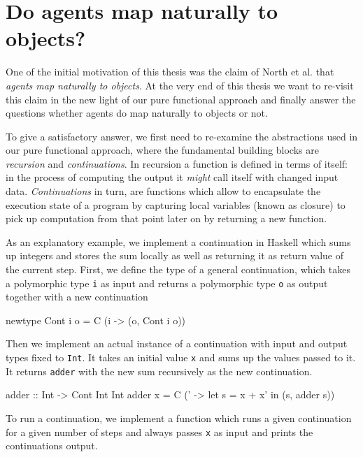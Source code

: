 \section{Do agents map naturally to objects?}
One of the initial motivation of this thesis was the claim of North et al. \cite{north_managing_2007} that \textit{agents map naturally to objects}. At the very end of this thesis we want to re-visit this claim in the new light of our pure functional approach and finally answer the questions whether agents do map naturally to objects or not.

\medskip

To give a satisfactory answer, we first need to re-examine the abstractions used in our pure functional approach, where the fundamental building blocks are \textit{recursion} and \textit{continuations}. In recursion a function is defined in terms of itself: in the process of computing the output it \textit{might} call itself with changed input data. \textit{Continuations} in turn, are functions which allow to encapsulate the execution state of a program by capturing local variables (known as closure) to pick up computation from that point later on by returning a new function.

As an explanatory example, we implement a continuation in Haskell which sums up integers and stores the sum locally as well as returning it as return value of the current step. First, we define the type of a general continuation, which takes a polymorphic type \texttt{i} as input and returns a polymorphic type \texttt{o} as output together with a new continuation

\begin{HaskellCode}
newtype Cont i o = C (i -> (o, Cont i o))
\end{HaskellCode}

Then we implement an actual instance of a continuation with input and output types fixed to \texttt{Int}. It takes an initial value \texttt{x} and sums up the values passed to it. It returns \texttt{adder} with the new sum recursively as the new continuation.

\begin{HaskellCode}
adder :: Int -> Cont Int Int
adder x = C (\x' -> let s = x + x' in
                    (s, adder s))
\end{HaskellCode}

To run a continuation, we implement a function which runs a given continuation for a given number of steps and always passes \texttt{x} as input and prints the continuations output.

